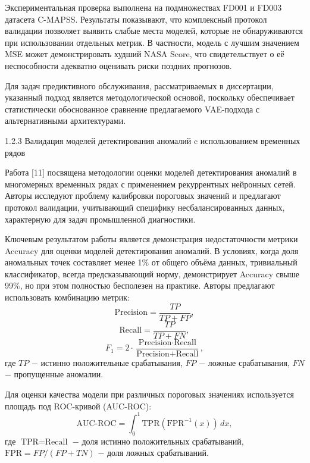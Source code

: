 \documentclass[14pt, a4paper, oneside]{extreport}
\begin{document}
Экспериментальная проверка выполнена на подмножествах FD001 и FD003 датасета C-MAPSS. Результаты показывают, что комплексный протокол валидации позволяет выявить слабые места моделей, которые не обнаруживаются при использовании отдельных метрик. В частности, модель с лучшим значением MSE может демонстрировать худший NASA Score, что свидетельствует о её неспособности адекватно оценивать риски поздних прогнозов.

Для задач предиктивного обслуживания, рассматриваемых в диссертации, указанный подход является методологической основой, поскольку обеспечивает статистически обоснованное сравнение предлагаемого VAE-подхода с альтернативными архитектурами.

\vspace{1em}
{1.2.3 Валидация моделей детектирования аномалий c использованием временных рядов}
\vspace{1em}

Работа $[$11$]$  посвящена методологии оценки моделей детектирования аномалий в многомерных временных рядах с применением рекуррентных нейронных сетей. Авторы исследуют проблему калибровки пороговых значений и предлагают протокол валидации, учитывающий специфику несбалансированных данных, характерную для задач промышленной диагностики.

Ключевым результатом работы является демонстрация недостаточности метрики Accuracy для оценки моделей детектирования аномалий. В условиях, когда доля аномальных точек составляет менее 1\% от общего объёма данных, тривиальный классификатор, всегда предсказывающий норму, демонстрирует Accuracy свыше 99\%, но при этом полностью бесполезен на практике. Авторы предлагают использовать комбинацию метрик:
\begin{equation}
\text{Precision} = \frac{TP}{TP + FP},
\end{equation}
\begin{equation}
\text{Recall} = \frac{TP}{TP + FN},
\end{equation}
\begin{equation}
F_1 = 2 \cdot \frac{\text{Precision} \cdot \text{Recall}}{\text{Precision} + \text{Recall}},
\end{equation}
где $TP$ $-$ истинно положительные срабатывания, $FP$ $-$ ложные срабатывания, $FN$ $-$ пропущенные аномалии.

Для оценки качества модели при различных пороговых значениях используется площадь под ROC-кривой (AUC-ROC):
\begin{equation}
\text{AUC-ROC} = \int_0^1 \text{TPR}(\text{FPR}^{-1}(x)) \, dx,
\end{equation}
где $\text{TPR} = \text{Recall}$ $-$ доля истинно положительных срабатываний, $\text{FPR} = FP / (FP + TN)$ $-$ доля ложных срабатываний.
\end{document}
